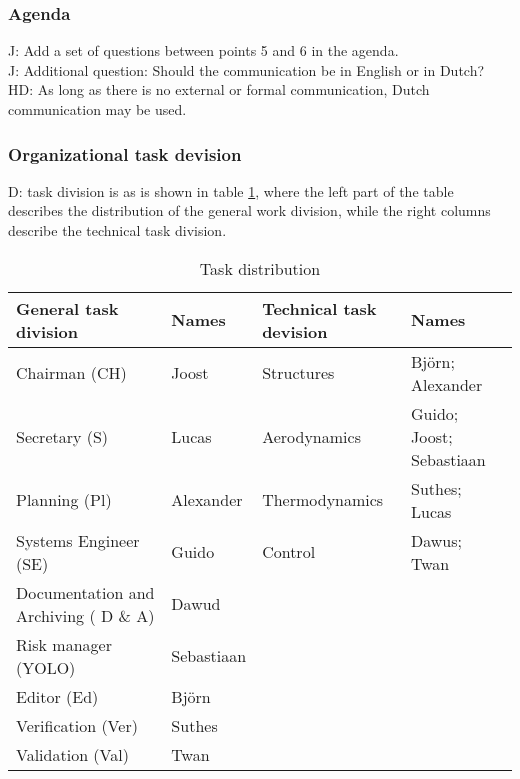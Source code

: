 \subsubsection{Agenda}
J: Add a set of questions between points 5 and 6 in the agenda.\\
J: Additional question: Should the communication be in English or in Dutch? 
HD: As long as there is no external or formal communication, Dutch communication may be used.

\subsubsection{Organizational task devision}
D: task division is as is shown in table \ref{tab:tasks}, where the left part of the table describes the distribution of the general work division, while the right columns describe the technical task division.

\begin{table}[H]
	\caption {Task distribution}
    \begin{tabular}{|p{}|p{}|p{}|p{}|}
    \hline
    General task division                 & Names      & Technical task devision & Names                    \\ \hline \hline
    Chairman (CH)                         & Joost      & Structures              & Bj\"{o}rn; Alexander         \\ \hline
    Secretary (S)                         & Lucas      & Aerodynamics            & Guido; Joost; Sebastiaan \\ \hline
    Planning (Pl)                         & Alexander  & Thermodynamics                 & Suthes; Lucas            \\ \hline
    Systems Engineer (SE)                 & Guido      & Control                 & Dawus; Twan              \\ \hline
    Documentation and Archiving ( D \& A) & Dawud      & ~                       & ~                        \\ \hline
    Risk manager (YOLO)                   & Sebastiaan & ~                       & ~                        \\ \hline
    Editor (Ed)                           & Bj\"{o}rn      & ~                       & ~                        \\ \hline
    Verification (Ver)                    & Suthes     & ~                       & ~                        \\ \hline
    Validation (Val)                      & Twan       & ~                       & ~                        \\ \hline
    \end{tabular}
    \label{tab:tasks}
\end{table}

